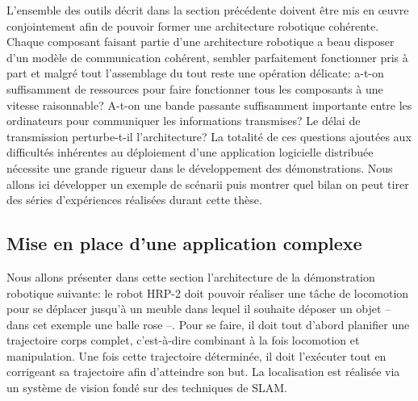 L'ensemble des outils décrit dans la section précédente doivent être
mis en \oe uvre conjointement afin de pouvoir former une architecture
robotique cohérente. Chaque composant faisant partie d'une
architecture robotique a beau disposer d'un modèle de communication
cohérent, sembler parfaitement fonctionner pris à part et malgré tout
l'assemblage du tout reste une opération délicate: a-t-on suffisamment
de ressources pour faire fonctionner tous les composants à une vitesse
raisonnable? A-t-on une bande passante suffisamment importante entre
les ordinateurs pour communiquer les informations transmises? Le délai
de transmission perturbe-t-il l'architecture? La totalité de ces
questions ajoutées aux difficultés inhérentes au déploiement d'une
application logicielle distribuée nécessite une grande rigueur dans le
développement des démonstrations. Nous allons ici développer un
exemple de scénarii puis montrer quel bilan on peut tirer des séries
d'expériences réalisées durant cette thèse.


\subsection{Mise en place d'une application complexe}


Nous allons présenter dans cette section l'architecture de la
démonstration robotique suivante: le robot HRP-2 doit pouvoir réaliser
une tâche de locomotion pour se déplacer jusqu'à un meuble dans lequel
il souhaite déposer un objet -- dans cet exemple une balle rose
--. Pour se faire, il doit tout d'abord planifier une trajectoire
corps complet, c'est-à-dire combinant à la fois locomotion et
manipulation. Une fois cette trajectoire déterminée, il doit
l'exécuter tout en corrigeant sa trajectoire afin d'atteindre son
but. La localisation est réalisée via un système de vision fondé sur
des techniques de SLAM.

